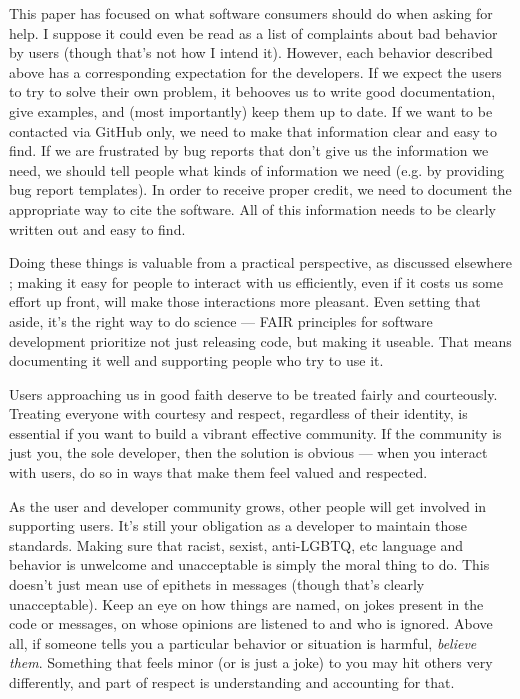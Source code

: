 \documentclass[9pt,training,ASAPversion]{livecoms}
\begin{document}
This paper has focused on what software consumers should do when asking for
help.  I suppose it could even be read as a list of complaints about bad
behavior by users (though that's not how I intend it). However, each behavior
described above has a corresponding expectation for the developers. If we expect
the users to try to solve their own problem, it behooves us to write good
documentation, give examples, and (most importantly) keep them up to date. If we
want to be contacted via GitHub only, we need to make that information clear and
easy to find. If we are frustrated by bug reports that don't give us the
information we need, we should tell people what kinds of information we need
(e.g. by providing bug report templates). In order to receive proper credit, we
need to document the appropriate way to cite the software. All of this
information needs to be clearly written out and easy to find.

Doing these things is valuable from a practical perspective, as discussed
elsewhere \cite{Heister-2013, Laayouni-2016, Wallqvist-2019}; making it easy for
people to interact with us efficiently, even if it costs us some effort up
front, will make those interactions more pleasant. Even setting that aside, it's
the right way to do science --- FAIR principles for software development
\cite{Lamprecht-2020} prioritize not just releasing code, but making it useable.
That means documenting it well and supporting people who try to use it.

Users approaching us in good faith deserve to be treated fairly and courteously.
Treating everyone with courtesy and respect, regardless of their identity, is
essential if you want to build a vibrant effective community.  If the community
is just you, the sole developer, then the solution is obvious --- when you
interact with users, do so in ways that make them feel valued and respected.

As the user and developer community grows, other people will get involved in
supporting users. It's still your obligation as a developer to maintain those
standards.  Making sure that racist, sexist, anti-LGBTQ, etc language and
behavior is unwelcome and unacceptable is simply the moral thing to do.  This
doesn't just mean use of epithets in messages (though that's clearly
unacceptable). Keep an eye on how things are named, on jokes present in the code
or messages, on whose opinions are listened to and who is ignored.  Above all,
if someone tells you a particular behavior or situation is harmful,
\emph{believe them}.  Something that feels minor (or is just a joke) to you may
hit others very differently, and part of respect is understanding and accounting
for that.
\end{document}

